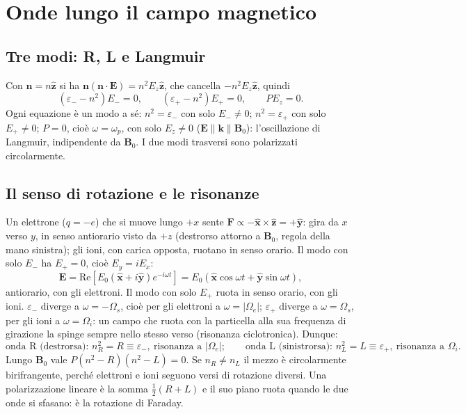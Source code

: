 \section{Onde lungo il campo magnetico}
\subsection{Tre modi: R, L e Langmuir}
Con $\mathbf{n}=n\hat{\mathbf{z}}$ si ha $\mathbf{n}(\mathbf{n}\cdot\mathbf{E})=n^2E_z\hat{\mathbf{z}}$, che cancella $-n^2E_z\hat{\mathbf{z}}$, quindi
\begin{equation}
(\varepsilon_--n^2)E_-=0,\qquad(\varepsilon_+-n^2)E_+=0,\qquad PE_z=0 .
\end{equation}
Ogni equazione è un modo a sé: $n^2=\varepsilon_-$ con solo $E_-\neq0$; $n^2=\varepsilon_+$ con solo $E_+\neq0$; $P=0$, cioè $\omega=\omega_p$, con solo $E_z\neq0$ ($\mathbf{E}\parallel\mathbf{k}\parallel\mathbf{B}_0$): l'oscillazione di Langmuir, indipendente da $\mathbf{B}_0$. I due modi trasversi sono polarizzati circolarmente.

\subsection{Il senso di rotazione e le risonanze}
Un elettrone ($q=-e$) che si muove lungo $+x$ sente $\mathbf{F}\propto-\hat{\mathbf{x}}\times\hat{\mathbf{z}}=+\hat{\mathbf{y}}$: gira da $x$ verso $y$, in senso antiorario visto da $+z$ (destrorso attorno a $\mathbf{B}_0$, regola della mano sinistra); gli ioni, con carica opposta, ruotano in senso orario. Il modo con solo $E_-$ ha $E_+=0$, cioè $E_y=iE_x$:
\begin{equation}
\mathbf{E}=\mathrm{Re}\left[E_0(\hat{\mathbf{x}}+i\hat{\mathbf{y}})e^{-i\omega t}\right]=E_0(\hat{\mathbf{x}}\cos\omega t+\hat{\mathbf{y}}\sin\omega t),
\end{equation}
antiorario, con gli elettroni. Il modo con solo $E_+$ ruota in senso orario, con gli ioni. $\varepsilon_-$ diverge a $\omega=-\Omega_s$, cioè per gli elettroni a $\omega=|\Omega_e|$; $\varepsilon_+$ diverge a $\omega=\Omega_s$, per gli ioni a $\omega=\Omega_i$: un campo che ruota con la particella alla sua frequenza di girazione la spinge sempre nello stesso verso (risonanza ciclotronica). Dunque:
\begin{equation}
\text{onda R (destrorsa): }n_R^2=R\equiv\varepsilon_-,\ \text{risonanza a }|\Omega_e|;\qquad\text{onda L (sinistrorsa): }n_L^2=L\equiv\varepsilon_+,\ \text{risonanza a }\Omega_i .
\end{equation}
Lungo $\mathbf{B}_0$ vale $P(n^2-R)(n^2-L)=0$. Se $n_R\neq n_L$ il mezzo è circolarmente birifrangente, perché elettroni e ioni seguono versi di rotazione diversi. Una polarizzazione lineare è la somma $\frac12(R+L)$ e il suo piano ruota quando le due onde si sfasano: è la rotazione di Faraday.

